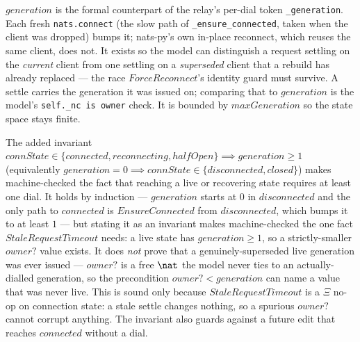 \documentclass[a4paper,10pt,fleqn]{article}
\begin{document}
$generation$ is the formal counterpart of the relay's per-dial
token \texttt{\_generation}.  Each fresh \texttt{nats.connect}
(the slow path of \texttt{\_ensure\_connected}, taken when the
client was dropped) bumps it; nats-py's own in-place reconnect,
which reuses the same client, does not.  It exists so the model
can distinguish a request settling on the \emph{current} client
from one settling on a \emph{superseded} client that a rebuild has
already replaced --- the race $ForceReconnect$'s identity guard
must survive.  A settle carries the generation it was issued on;
comparing that to $generation$ is the model's \texttt{self.\_nc is
owner} check.  It is bounded by $maxGeneration$ so the state space
stays finite.

The added invariant $connState \in \{ connected, reconnecting,
halfOpen \} \implies generation \geq 1$ (equivalently $generation =
0 \implies connState \in \{ disconnected, closed \}$) makes
machine-checked the fact that reaching a live or recovering state
requires at least one dial.  It holds by induction --- $generation$
starts at $0$ in $disconnected$ and the only path to $connected$ is
$EnsureConnected$ from $disconnected$, which bumps it to at least
$1$ --- but stating it as an invariant makes machine-checked the one
fact $StaleRequestTimeout$ needs: a live state has $generation \geq 1$,
so a strictly-smaller $owner?$ value exists.  It does \emph{not} prove
that a genuinely-superseded live generation was ever issued --- $owner?$
is a free $\nat$ the model never ties to an actually-dialled generation,
so the precondition $owner? < generation$ can name a value that was never
live.  This is sound only because $StaleRequestTimeout$ is a $\Xi$ no-op
on connection state: a stale settle changes nothing, so a spurious
$owner?$ cannot corrupt anything.  The invariant also guards against a
future edit that reaches $connected$ without a dial.
\end{document}
